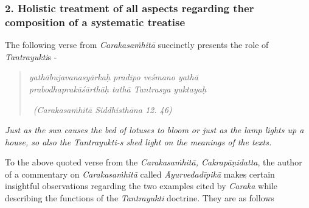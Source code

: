 \subsubsection*{2. Holistic treatment of all aspects regarding ther composition of a systematic treatise}

The following verse from \textit{Carakasaṁhitā} succinctly presents the role of \textit{Tantrayukti}s -

\begin{verse}
\textit{yathābujavanasyārkaḥ pradīpo veśmano yathā}\\\textit{prabodhaprakāśārthāḥ tathā Tantrasya yuktayaḥ }

~\hfill \textit{(Carakasaṁhitā Siddhisthāna 12. 46)}
\end{verse}

\textit{Just as the sun causes the bed of lotuses to bloom or just as the lamp lights up a house, so also the Tantrayukti-s shed light on the meanings of the texts.}

To the above quoted verse from the \textit{Carakasaṁhitā, Cakrapāṇidatta}, the author of a commentary on \textit{Carakasaṁhitā} called \textit{Āyurvedadīpikā} makes certain insightful observations regarding the two examples cited by \textit{Caraka} while describing the functions of the \textit{Tantrayukti} doctrine. They are as follows

